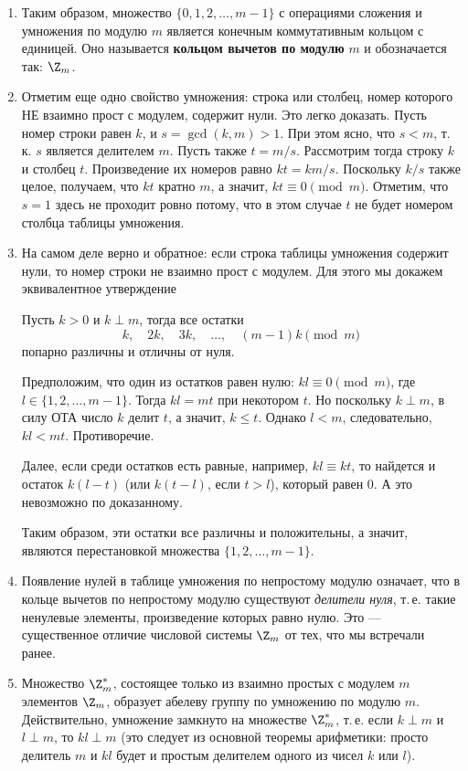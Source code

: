 \begin{enumerate}
\item Таким образом, множество $\{0,1,2,\dots,m-1\}$ с операциями сложения и умножения по модулю $m$ является конечным коммутативным кольцом с единицей. Оно называется \textbf{кольцом вычетов по модулю} $m$ и обозначается так: $\Z_m$.

\item Отметим еще одно свойство умножения: строка или столбец, номер которого НЕ взаимно прост с модулем, содержит нули. Это легко доказать. Пусть номер строки равен $k$, и $s=\gcd(k,m)>1$. При этом ясно, что $s<m$, т.\,к. $s$ является делителем $m$. Пусть также $t=m/s$. Рассмотрим тогда строку $k$ и столбец $t$. Произведение их номеров равно $kt=km/s$. Поскольку $k/s$ также целое, получаем, что $kt$ кратно $m$, а значит, $kt\equiv 0\pmod m$. Отметим, что $s=1$ здесь не проходит ровно потому, что в этом случае $t$ не будет номером столбца таблицы умножения.
\item На самом деле верно и обратное: если строка таблицы умножения содержит нули, то номер строки не взаимно прост с модулем. Для этого мы докажем эквивалентное утверждение
\begin{thrm}\label{k2k3k}
Пусть $k>0$  и  $k\perp m$, тогда все остатки
$$
k,\quad 2k,\quad 3k,\quad\dots,\quad (m-1)k\pmod m
$$
попарно различны и отличны от нуля.
\end{thrm}
\pf Предположим, что один из остатков равен нулю: $kl\equiv 0\pmod m$, где $l\in\{1,2,\dots,m-1\}$. Тогда $kl=mt$ при некотором $t$. Но поскольку $k\perp m$, в силу ОТА число $k$ делит $t$, а значит, $k\le t$. Однако $l<m$, следовательно, $kl<mt$. Противоречие.

Далее, если среди остатков есть равные, например, $kl\equiv kt$, то найдется и остаток $k(l-t)$ (или $k(t-l)$, если $t>l$), который равен 0. А это невозможно по доказанному. 

Таким образом, эти остатки все различны и положительны, а значит, являются перестановкой множества $\{1,2,\dots,m-1\}$.
\epf

\item Появление нулей в таблице умножения по непростому модулю означает, что в кольце вычетов по непростому модулю существуют \textit{делители нуля}, т.\,е. такие ненулевые элементы, произведение которых равно нулю. Это --- существенное отличие числовой системы $\Z_m$ от тех, что мы встречали ранее.

\item Множество $\Z_m^*$, состоящее только из взаимно простых с модулем $m$ элементов $\Z_m$, образует абелеву группу по умножению по модулю $m$. Действительно, умножение замкнуто на множестве $\Z_m^*$, т.\,е. если $k\perp m$ и $l\perp m$, то $kl\perp m$ (это следует из основной теоремы арифметики: просто делитель $m$ и $kl$ будет и простым делителем одного из чисел $k$ или $l$).


\end{enumerate}
